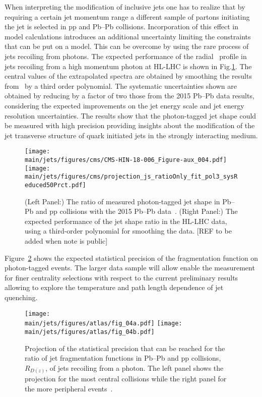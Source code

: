 When interpreting the modification of inclusive jets one has to realize that by requiring a certain jet momentum range a different sample of partons initiating the jet is selected in pp and Pb--Pb collisions. Incorporation of this effect in model calculations introduces an additional uncertainty limiting the constraints that can be put on a model. This can be overcome by using the rare process of jets recoiling from photons. The expected performance of the radial \pT\ profile in jets recoiling from a high momentum photon at HL-LHC is shown in Fig.\ref{fig:jetshape}. The central values of the extrapolated spectra are obtained by smoothing the results from~\cite{Sirunyan:2018ncy} by a third order polynomial. The systematic uncertainties shown are obtained by reducing by a factor of two those from the 2015 Pb--Pb data results, considering the expected improvements on the jet energy scale and jet energy resolution uncertainties. The results show that the photon-tagged jet shape could be measured with high precision providing insights about the modification of the jet transverse structure of quark initiated jets in the strongly interacting medium.
%
\begin{figure}[!ht]
\begin{center}
\texttt{[image: \\main/jets/figures/cms/CMS-HIN-18-006\_Figure-aux\_004.pdf]}
\texttt{[image: \\main/jets/figures/cms/projection\_js\_ratioOnly\_fit\_pol3\_sysReduced50Prct.pdf]}
\caption{(Left Panel:) The ratio of measured photon-tagged jet shape in Pb--Pb and pp collisions with the 2015 Pb--Pb data~\cite{Sirunyan:2018ncy}. (Right Panel:) The expected performance of the jet shape ratio in the HL-LHC data, using a third-order polynomial for smoothing the data. [REF to be added when note is public]}
\label{fig:jetshape}
\end{center}
\end{figure}
%
Figure~\ref{fig:jetDzPh} shows the expected statistical precision of the fragmentation function on photon-tagged events. The larger data sample will allow enable the measurement for finer centrality selections with respect to the current preliminary results~\cite{ATLAS-CONF-2017-074} allowing to explore the temperature and path length dependence of jet quenching. 
\begin{figure}[!ht]
\begin{center}
\texttt{[image: \\main/jets/figures/atlas/fig\_04a.pdf]}
\texttt{[image: \\main/jets/figures/atlas/fig\_04b.pdf]}
\caption{Projection of the statistical precision that can be reached for the ratio of jet fragmentation functions in Pb--Pb and pp collisions, $R_{D(z)}$, of jets recoiling from a photon. The left panel shows the projection for the most central collisions while the right panel for the more peripheral events~\cite{ATL-PHYS-PUB-2018-019}.}
\label{fig:jetDzPh}
\end{center}
\end{figure}


